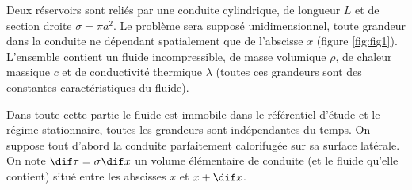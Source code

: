 \documentclass[a4paper,french,bookmarks]{article}
\begin{document}
    \renewcommand{\thesection}{\Roman{section}} 
    \renewcommand{\thesubsection}{\thesection.\Alph{subsection}}
    \renewcommand{\labelenumi}{\arabic{enumi}.}
    \renewcommand*{\labelenumii}{\roman{enumii})}
    
    
    Deux réservoirs sont reliés par une conduite cylindrique, de longueur $L$ et de section droite $\sigma = \pi a^2$. Le problème sera supposé unidimensionnel, toute grandeur dans la conduite ne dépendant spatialement que de l'abscisse $x$ (\cf figure \ref{fig:fig1}). L'ensemble contient un fluide incompressible, de masse volumique $\rho$, de chaleur massique $c$ et de conductivité thermique $\lambda$ (toutes ces grandeurs sont des constantes caractéristiques du fluide).
    
    \begin{center}
        
        \label{fig:fig1}
    \end{center}
    
    Dans toute cette partie le fluide est immobile dans le référentiel d'étude et le régime stationnaire, toutes les grandeurs sont indépendantes du temps. On suppose tout d'abord la conduite parfaitement calorifugée sur sa surface latérale. On note $\dif \tau = \sigma\dif x$ un volume élémentaire de conduite (et le fluide qu'elle contient) situé entre les abscisses $x$ et $x + \dif x$.
    
\end{document}
